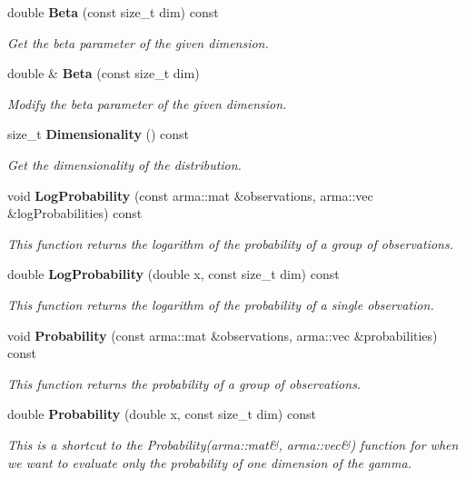 \begin{DoxyCompactItemize}
double \textbf{ Beta} (const size\+\_\+t dim) const
\begin{DoxyCompactList}\small\item\em Get the beta parameter of the given dimension. \end{DoxyCompactList}\item 
double \& \textbf{ Beta} (const size\+\_\+t dim)
\begin{DoxyCompactList}\small\item\em Modify the beta parameter of the given dimension. \end{DoxyCompactList}\item 
size\+\_\+t \textbf{ Dimensionality} () const
\begin{DoxyCompactList}\small\item\em Get the dimensionality of the distribution. \end{DoxyCompactList}\item 
void \textbf{ Log\+Probability} (const arma\+::mat \&observations, arma\+::vec \&log\+Probabilities) const
\begin{DoxyCompactList}\small\item\em This function returns the logarithm of the probability of a group of observations. \end{DoxyCompactList}\item 
double \textbf{ Log\+Probability} (double x, const size\+\_\+t dim) const
\begin{DoxyCompactList}\small\item\em This function returns the logarithm of the probability of a single observation. \end{DoxyCompactList}\item 
void \textbf{ Probability} (const arma\+::mat \&observations, arma\+::vec \&probabilities) const
\begin{DoxyCompactList}\small\item\em This function returns the probability of a group of observations. \end{DoxyCompactList}\item 
double \textbf{ Probability} (double x, const size\+\_\+t dim) const
\begin{DoxyCompactList}\small\item\em This is a shortcut to the Probability(arma\+::mat\&, arma\+::vec\&) function for when we want to evaluate only the probability of one dimension of the gamma. \end{DoxyCompactList}\item 

\end{DoxyCompactItemize}
